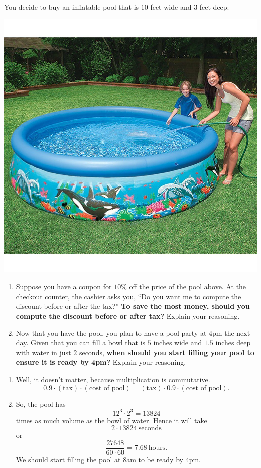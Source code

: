 \documentclass[nooutcomes,noauthor,handout]{ximera}
\begin{document}
\begin{question}
  You decide to buy an inflatable pool that is $10$ feet wide and $3$
  feet deep:
  \begin{center}
    \includegraphics[width=.4\textwidth]{tenFtPool.jpg}
  \end{center}
  \begin{enumerate}
    \item Suppose you have a coupon for $10\%$ off the price of the
      pool above. At the checkout counter, the cashier asks you, ``Do
      you want me to compute the discount before or after the tax?''
      \textbf{To save the most money, should you compute the discount
        before or after tax?} Explain your reasoning.
    \item Now that you have the pool, you plan to have a pool party at
      $4$pm the next day. Given that you can fill a bowl that is $5$
      inches wide and $1.5$ inches deep with water in just $2$ seconds,
      \textbf{when should you start filling your pool to ensure it is ready by
      $\boldsymbol 4$pm?}  Explain your reasoning.
  \end{enumerate}
  \begin{freeResponse}
    \begin{enumerate}
    \item Well, it doesn't matter, because multiplication is commutative.
      \[
      0.9 \cdot (\text{tax}) \cdot (\text{cost of pool})= (\text{tax})\cdot
      0.9\cdot (\text{cost of pool}).
      \]
    \item So, the pool has
      \[
      12^3 \cdot 2^3 = 13824
      \]
      times as much volume as the bowl of water. Hence it will take
      \[
      2\cdot 13824~\text{seconds}
      \]
      or
      \[
      \frac{27648}{60\cdot 60} = 7.68~\text{hours}.
      \]
      We should start filling the pool at $8$am to be ready by $4$pm.
    \end{enumerate}
  \end{freeResponse}
\end{question}
\mynewpage
\end{document}
